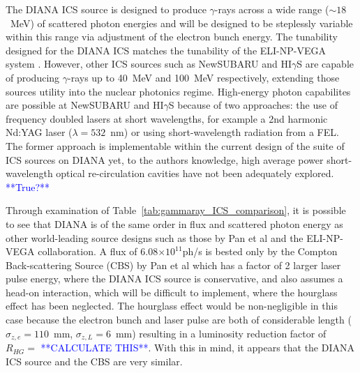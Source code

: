 \documentclass[../main.tex]{subfiles}
\begin{document}
The DIANA ICS source is designed to produce $\gamma$-rays across a wide  range ($\sim18$~\si{\mega\electronvolt}) of scattered photon energies and will be designed to be steplessly variable within this range via adjustment of the electron bunch energy. The tunability designed for the DIANA ICS matches the tunability of the ELI-NP-VEGA system \cite{tanaka2020current,elinp2019vega}. However, other ICS sources such as NewSUBARU and HI$\gamma$S are capable of producing $\gamma$-rays up to 40~\si{\mega\electronvolt} and 100~\si{\mega\electronvolt} respectively, extending those sources utility into the nuclear photonics regime. High-energy photon capabilites are possible at NewSUBARU and HI$\gamma$S because of two approaches: the use of frequency doubled lasers at short wavelengths, for example a 2nd harmonic Nd:YAG laser ($\lambda = 532$~\si{\nano\meter}) or using short-wavelength radiation from a FEL. The former approach is implementable within the current design of the suite of ICS sources on DIANA yet, to the authors knowledge, high average power short-wavelength optical re-circulation cavities have not been adequately explored. \textcolor{blue}{**True?**}  

Through examination of Table~\ref{tab:gammaray_ICS_comparison}, it is possible to see that DIANA is of the same order in flux and scattered photon energy as other world-leading source designs such as those by Pan et al and the ELI-NP-VEGA collaboration. A flux of 6.08$\times 10^{11}$ph/\si{\second} is bested only by the Compton Back-scattering Source (CBS) by Pan et al \cite{pan2019design} which has a factor of 2 larger laser pulse energy, where the DIANA ICS source is conservative, and also assumes a head-on interaction, which will be difficult to implement, where the hourglass effect has been neglected. The hourglass effect would be non-negligible in this case because the electron bunch and laser pulse are both of considerable length ($\sigma_{z,e} = 110$~\si{\milli\meter}, $\sigma_{z,L} = 6$~\si{\milli\meter}) resulting in a luminosity reduction factor of $R_{HG} = $ \textcolor{blue}{**CALCULATE THIS**}. With this in mind, it appears that the DIANA ICS source and the CBS are very similar. 
\end{document}
